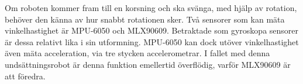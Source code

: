 \documentclass[11pt]{article}
\begin{document}
\begin{flushleft}
Om roboten kommer fram till en korsning och ska svänga, med hjälp av rotation, behöver den känna av hur snabbt rotationen sker. Två sensorer som kan mäta vinkelhastighet är MPU-6050 och MLX90609. Betraktade som gyroskopa sensorer är dessa relativt lika i sin utformning. MPU-6050 kan dock utöver vinkelhastighet även mäta acceleration, via tre stycken accelerometrar. I fallet med denna undsättningsrobot är denna funktion emellertid överflödig, varför MLX90609 är att föredra. 


\pagebreak
{}




\pagebreak
\appendix

\end{flushleft}



\end{document}
